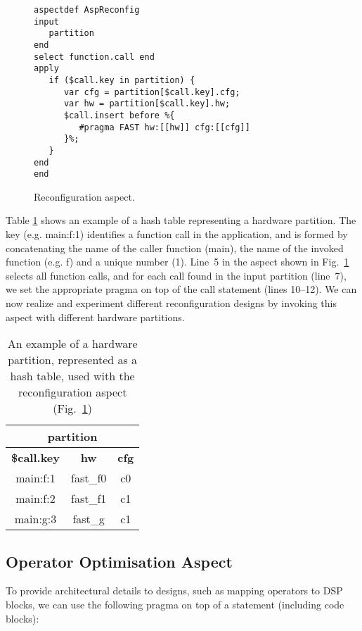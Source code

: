 \lstset{style=lara}
\begin{figure}[!h]
\begin{lstlisting}
aspectdef AspReconfig
input
   partition
end
select function.call end
apply
   if ($call.key in partition) {
      var cfg = partition[$call.key].cfg;
      var hw = partition[$call.key].hw;
      $call.insert before %{
         #pragma FAST hw:[[hw]] cfg:[[cfg]]
      }%;
   }
end
end
\end{lstlisting}
\caption{Reconfiguration aspect.}
\label{fig:aspect-reconf}
\end{figure}

Table \ref{fig:aspect-hash} shows an example of a hash table
representing a hardware partition. The key (e.g. main:f:1) identifies
a function call in the application, and is formed by concatenating the
name of the caller function (main), the name of the invoked function
(e.g. f) and a unique number (1).  Line~5 in the aspect shown in
Fig.~\ref{fig:aspect-reconf} selects all function calls, and for each
call found in the input partition (line~7), we set the appropriate
pragma on top of the call statement (lines 10--12). We can now realize
and experiment different reconfiguration designs by invoking this
aspect with different hardware partitions.


\begin{table}[!h]
\caption{An example of a hardware partition, represented as a hash
  table, used with the reconfiguration aspect
  (Fig.~\ref{fig:aspect-reconf})}
\label{fig:aspect-hash}
\centering
\begin{tabular}{c|c|c}
\hline
\multicolumn{3}{c}{\bf{partition}} \\
\hline
\bf{\$call.key} & \bf{hw} & \bf{cfg}  \\
\hline
main:f:1 & fast\_f0 & c0 \\
main:f:2 & fast\_f1 & c1 \\
main:g:3 & fast\_g & c1 \\
\hline
\end{tabular}
\end{table}

\subsection{Operator Optimisation Aspect}
\label{sect:asp_ops}
To provide architectural details to \MAXC{} designs, such as mapping
operators to DSP blocks, we can use the following \MAXC{} pragma on
top of a statement (including code blocks):
\vspace{2mm}

